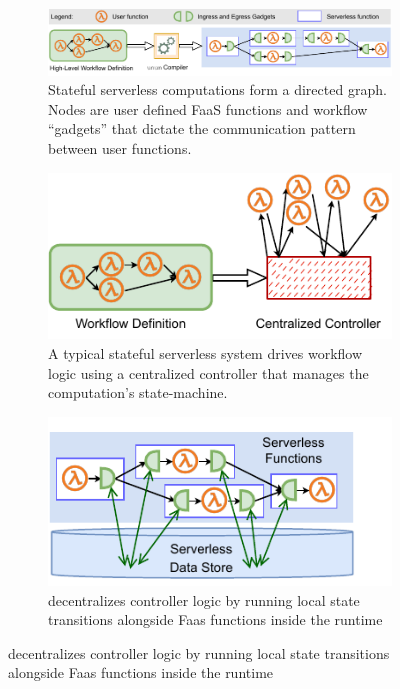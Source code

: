 \begin{figure}[t]
	\centering
	\begin{subfigure}[t]{0.8\textwidth}
		\includegraphics[width=\columnwidth]{figures/unum-arch-compile-time.pdf}
		\caption{Stateful serverless computations form a directed graph. Nodes
			are user defined FaaS functions and workflow ``gadgets'' that dictate the
			communication pattern between user functions.}
		\label{fig:arch:unum-compile-time}
	\end{subfigure}
	\begin{subfigure}[b]{\columnwidth}
		\centering
		\includegraphics[width=0.8\columnwidth]{figures/unum-arch-centralized.pdf}
		\caption{A typical stateful serverless system drives workflow logic
			using a centralized controller that manages the computation's state-machine.}
		\label{fig:arch:centralized}
	\end{subfigure}
	\hfill
	\begin{subfigure}[b]{\columnwidth}
		\centering
		\includegraphics[width=0.5\columnwidth]{figures/unum-arch-runtime.pdf}
		\caption{\name{} decentralizes controller logic by running local state
			transitions alongside Faas functions inside the \name{} runtime
}
\end{subfigure}
\end{figure}
